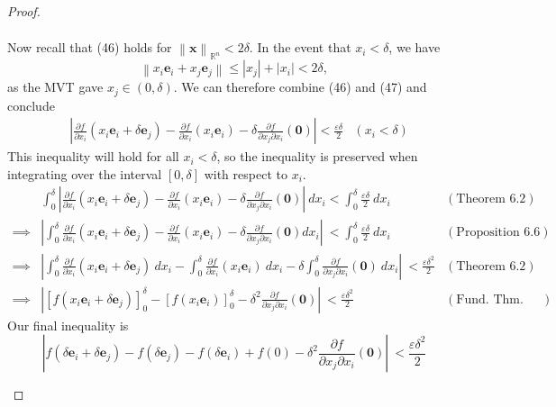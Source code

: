 \documentclass{article}
\newcommand{\R}{\mathbb{R}}
\newcommand{\x}{\mathbf{x}}
\newcommand{\ze}{\mathbf{0}}
\newcommand{\norm}[1]{\left\lVert#1\right\rVert}
\newcommand{\abs}[1]{\left\lvert#1\right\rvert}
\theoremstyle{definition}
\begin{document}
\begin{proof}
\begin{enumerate}
\begin{align}
			\end{align}
			Now recall that (46) holds for $ \norm{\x}_{\R^n}<2\delta $.  In the event that $ x_i < \delta  $, we have $$ \norm{x_i\mathbf e_i + x_j \mathbf e_j} \le |x_j| + |x_i| < 2\delta,$$ as the MVT gave $ x_j\in(0,\delta) $. We can therefore combine (46) and (47) and conclude 
			\begin{align*}
				&\abs{	\frac{\partial f}{\partial x_i}(x_i\mathbf e_i + \delta \mathbf e_j) - \frac{\partial f}{\partial x_i}(x_i\mathbf e_i)  - \delta \frac{\partial f}{\partial x_j\partial x_i}(\ze) }<\frac{ \varepsilon\delta}{2} & (x_i<\delta)
			\end{align*}
			This inequality will hold for all $ x_i < \delta $, so the inequality is preserved when integrating over the interval $ [0,\delta] $ with respect to $ x_i $.
			\begin{align*}
				&\int_{0}^{\delta}\abs{	\frac{\partial f}{\partial x_i}(x_i\mathbf e_i + \delta \mathbf e_j) - \frac{\partial f}{\partial x_i}(x_i\mathbf e_i)  - \delta \frac{\partial f}{\partial x_j\partial x_i}(\ze) }\ dx_i<\int_{0}^{\delta}\frac{ \varepsilon\delta}{2} \ dx_i& (\text{Theorem 6.2})\\
				\implies &
				\abs{\int_{0}^{\delta}	\frac{\partial f}{\partial x_i}(x_i\mathbf e_i + \delta \mathbf e_j) - \frac{\partial f}{\partial x_i}(x_i\mathbf e_i)  - \delta \frac{\partial f}{\partial x_j\partial x_i}(\ze) dx_i}\ <\int_{0}^{\delta}\frac{ \varepsilon\delta}{2} \ dx_i &(\text{Proposition 6.6})\\
				\implies &
				\abs{\int_{0}^{\delta}	\frac{\partial f}{\partial x_i}(x_i\mathbf e_i + \delta \mathbf e_j)\ dx_i - \int_{0}^{\delta}\frac{\partial f}{\partial x_i}(x_i\mathbf e_i)\ dx_i  - \delta\int_{0}^{\delta} \frac{\partial f}{\partial x_j\partial x_i}(\ze)\ dx_i}\ <\frac{ \varepsilon\delta^2}{2}  &(\text{Theorem 6.2})\\
				\implies &
				\abs{[f(x_i\mathbf e_i + \delta \mathbf e_j)]_0^\delta- [f(x_i\mathbf e_i)]_0^\delta  - \delta^2\frac{\partial f}{\partial x_j\partial x_i}(\ze)}\ <\frac{ \varepsilon\delta^2}{2}  &(\text{Fund. Thm. Calc})
			\end{align*}
			Our final inequality is 
			\begin{equation}\label{key}
				\abs{f(\delta\mathbf e_i + \delta \mathbf e_j) - f(\delta \mathbf e_j) -f(\delta\mathbf e_i ) + f(0) - \delta^2\frac{\partial f}{\partial x_j\partial x_i}(\ze)}\ <\dfrac{\varepsilon\delta^2}{2}
			\end{equation}
			

\end{enumerate}
\end{proof}
\end{document}
